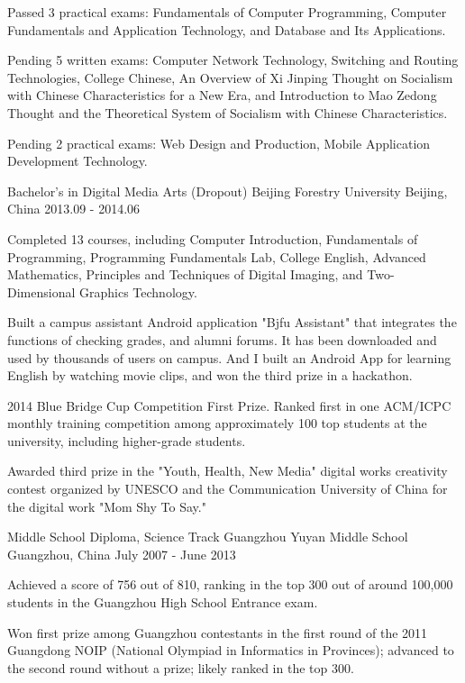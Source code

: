 \begin{cventries}
{\begin{cvitems}
        \item {Passed 3 practical exams: Fundamentals of Computer Programming, Computer Fundamentals and Application Technology, and Database and Its Applications.}
        \item {Pending 5 written exams: Computer Network Technology, Switching and Routing Technologies, College Chinese, An Overview of Xi Jinping Thought on Socialism with Chinese Characteristics for a New Era, and Introduction to Mao Zedong Thought and the Theoretical System of Socialism with Chinese Characteristics.}
        \item {Pending 2 practical exams: Web Design and Production, Mobile Application Development Technology.}
      \end{cvitems}
    }
  \cventry
    {Bachelor's in Digital Media Arts (Dropout)} %
    {Beijing Forestry University} %
    {Beijing, China} %
    {2013.09 - 2014.06} %
    {
      \begin{cvitems} %
        \item {Completed 13 courses, including Computer Introduction, Fundamentals of Programming, Programming Fundamentals Lab, College English, Advanced Mathematics, Principles and Techniques of Digital Imaging, and Two-Dimensional Graphics Technology.}
        \item {Built a campus assistant Android application "Bjfu Assistant" that integrates the functions of checking grades, and alumni forums. It has been downloaded and used by thousands of users on campus. And I built an Android App for learning English by watching movie clips, and won the third prize in a hackathon.}
        \item {2014 Blue Bridge Cup Competition First Prize. Ranked first in one ACM/ICPC monthly training competition among approximately 100 top students at the university, including higher-grade students.}
        \item {Awarded third prize in the "Youth, Health, New Media" digital works creativity contest organized by UNESCO and the Communication University of China for the digital work "Mom Shy To Say."}
      \end{cvitems}
    }

  \cventry
    {Middle School Diploma, Science Track} %
    {Guangzhou Yuyan Middle School} %
    {Guangzhou, China} %
    {July 2007 - June 2013} %
    {
      \begin{cvitems} %
        \item {Achieved a score of 756 out of 810, ranking in the top 300 out of around 100,000 students in the Guangzhou High School Entrance exam.}
        \item {Won first prize among Guangzhou contestants in the first round of the 2011 Guangdong NOIP (National Olympiad in Informatics in Provinces); advanced to the second round without a prize; likely ranked in the top 300.}
      \end{cvitems}
    }

\end{cventries}

